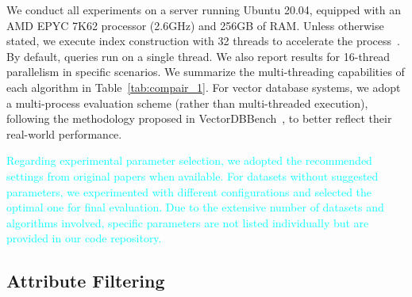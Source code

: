 \documentclass[sigconf, nonacm]{acmart}
\begin{document}
	
	We conduct all experiments on a server running Ubuntu 20.04, equipped with an AMD EPYC 7K62 processor (2.6GHz) and 256GB of RAM.  
	Unless otherwise stated, we execute index construction with 32 threads to accelerate the process~\cite{benchmarkindex}. By default, queries run on a single thread. We also report results for 16-thread parallelism in specific scenarios. We summarize the multi-threading capabilities of each algorithm in Table~\ref{tab:compair_1}. For vector database systems, we adopt a multi-process evaluation scheme (rather than multi-threaded execution), following the methodology proposed in VectorDBBench~\cite{VectorDBBench}, to better reflect their real-world performance.
	
	\textcolor{cyan}{
	Regarding experimental parameter selection, we adopted the recommended settings from original papers when available. For datasets without suggested parameters, we experimented with different configurations and selected the optimal one for final evaluation. Due to the extensive number of datasets and algorithms involved, specific parameters are not listed individually but are provided in our code repository.
}
	
	
	\subsection{Attribute Filtering}
	
	
\end{document}
